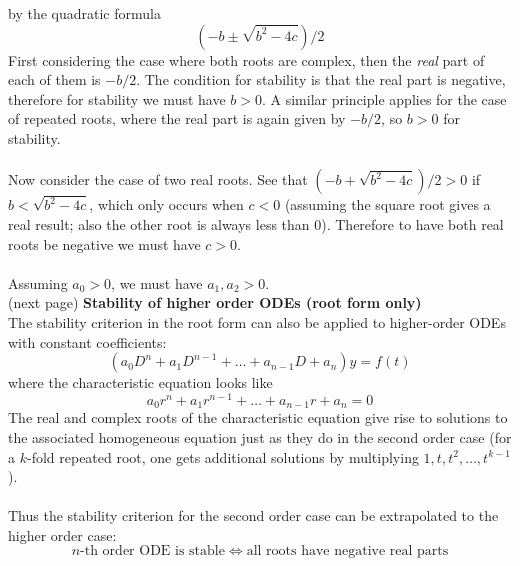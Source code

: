 \documentclass{report}
\begin{document}
by the quadratic formula
\begin{equation*}
(-b\pm\sqrt{b^2-4c})/2
\end{equation*}
First considering the case where both roots are complex, then the \textit{real} part of each of them is $-b/2$.
The condition for stability is that the real part is negative, therefore for stability we must have $b>0$. 
A similar principle applies for the case of repeated roots, where the real part is again given by $-b/2$, 
so $b>0$ for stability.\\
\vspace{1mm}\\
Now consider the case of two real roots. See that $(-b+\sqrt{b^2-4c})/2>0$ if $b<\sqrt{b^2-4c}$, which only occurs
when $c<0$ (assuming the square root gives a real result; also the other root is always less than 0).
Therefore to have both real roots be negative we must have $c>0$.\\
\vspace{1mm}\\
Assuming $a_0>0$, we must have $a_1,a_2>0$.\\
(next page)
\newpage
\noindent\textbf{Stability of higher order ODEs (root form only)}\\
The stability criterion in the root form can also be applied to higher-order ODEs with constant coefficients:
\begin{equation*}
(a_0D^n+a_1D^{n-1}+\ldots+a_{n-1}D+a_n)y=f(t)
\end{equation*}
where the characteristic equation looks like
\begin{equation*}
a_0r^n+a_1r^{n-1}+\ldots+a_{n-1}r+a_n=0
\end{equation*}
The real and complex roots of the characteristic equation give rise to solutions to the associated homogeneous equation just as they do in the second order case (for a $k$-fold repeated root, one gets additional solutions by 
multiplying $1,t,t^2,\ldots,t^{k-1}$).\\
\vspace{1mm}\\
Thus the stability criterion for the second order case can be extrapolated to the higher order case:
\begin{equation*}
n\text{-th order ODE is stable}\iff\text{all roots have negative real parts}
\end{equation*}
\newpage
\end{document}
